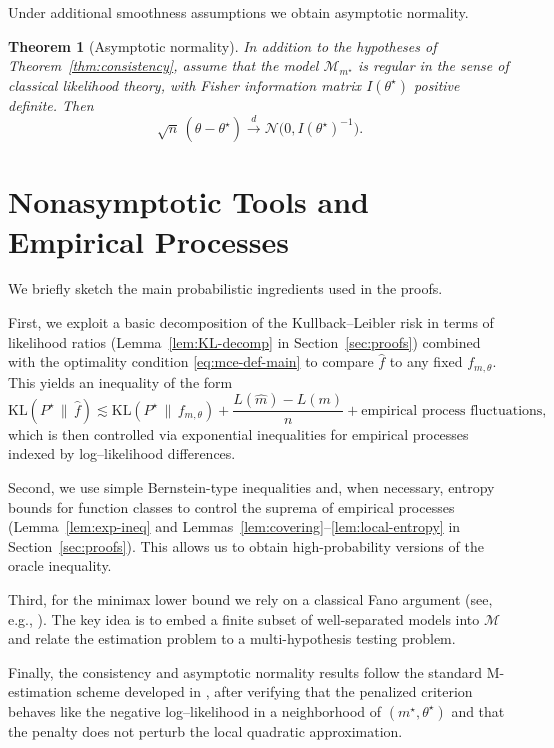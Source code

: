 \documentclass[12pt]{article}
\newtheorem{theorem}{Theorem}[section]
\numberwithin{equation}{section}
\begin{document}
	Under additional smoothness assumptions we obtain asymptotic normality.
	
	\begin{theorem}[Asymptotic normality]
		\label{thm:asymp-normal}
		In addition to the hypotheses of Theorem~\ref{thm:consistency}, assume
		that the model $\mathcal{M}_{m^{\star}}$ is regular in the sense of
		classical likelihood theory, with Fisher information matrix
		$I(\theta^{\star})$ positive definite. Then
		\[
		\sqrt{n}\,(\widehat{\theta}-\theta^{\star})
		\xrightarrow{d}
		\mathcal{N}\big(0, I(\theta^{\star})^{-1}\big).
		\]
	\end{theorem}
	
	\section{Nonasymptotic Tools and Empirical Processes}
	\label{sec:nonasymptotic}
	
	We briefly sketch the main probabilistic ingredients used in the proofs.
	
	First, we exploit a basic decomposition of the Kullback--Leibler risk in
	terms of likelihood ratios (Lemma~\ref{lem:KL-decomp} in
	Section~\ref{sec:proofs}) combined with the optimality condition
	\eqref{eq:mce-def-main} to compare $\widehat{f}$ to any fixed
	$f_{m,\theta}$. This yields an inequality of the form
	\[
	\mathrm{KL}(P^{\star}\,\|\,\widehat{f})
	\lesssim \mathrm{KL}(P^{\star}\,\|\,f_{m,\theta})
	+ \frac{L(\widehat{m})-L(m)}{n}
	+ \text{empirical process fluctuations},
	\]
	which is then controlled via exponential inequalities for empirical
	processes indexed by log--likelihood differences.
	
	Second, we use simple Bernstein-type inequalities and, when necessary,
	entropy bounds for function classes to control the suprema of empirical
	processes (Lemma~\ref{lem:exp-ineq} and Lemmas~\ref{lem:covering}--\ref{lem:local-entropy}
	in Section~\ref{sec:proofs}). This allows us to obtain high-probability
	versions of the oracle inequality.
	
	Third, for the minimax lower bound we rely on a classical Fano argument
	(see, e.g., \citealp{Tsybakov2009}). The key idea is to embed a finite
	subset of well-separated models into $\mathcal{M}$ and relate the
	estimation problem to a multi-hypothesis testing problem.
	
	Finally, the consistency and asymptotic normality results follow the
	standard M-estimation scheme developed in \cite{vdVart1998}, after
	verifying that the penalized criterion behaves like the negative
	log--likelihood in a neighborhood of $(m^{\star},\theta^{\star})$ and
	that the penalty does not perturb the local quadratic approximation.
	
\end{document}
